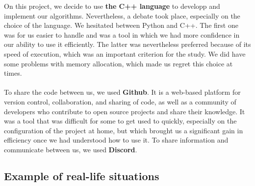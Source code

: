     On this project, we decide to use \textbf{the C++ language} to developp and implement our algorithms. Nevertheless, a debate took place, especially on the choice of the language. We hesitated between Python and C++. The first one was for us easier to handle and was a tool in which we had more confidence in our ability to use it efficiently. The latter was nevertheless preferred because of its speed of execution, which was an important criterion for the study. We did have some problems with memory allocation, which made us regret this choice at times.  \\ \\
    To share the code between us, we used \textbf{Github}\footnotemark {}. It is a web-based platform for version control, collaboration, and sharing of code, as well as a community of developers who contribute to open source projects and share their knowledge. It was a tool that was difficult for some to get used to quickly, especially on the configuration of the project at home, but which brought us a significant gain in efficiency once we had understood how to use it. To share information and communicate between us, we used \textbf{Discord}.
    
    


\subsection{Example of real-life situations}

